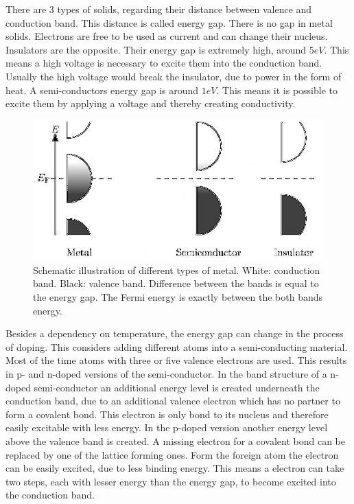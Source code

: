 \documentclass[]{article}
\begin{document}
There are 3 types of solids, regarding their distance between valence and conduction band. This distance is called energy gap. There is no gap in metal solids. Electrons are free to be used as current and can change their nucleus. Insulators are the opposite. Their energy gap is extremely high, around $5eV$. This means a high voltage is necessary to excite them into the conduction band. Usually the high voltage would break the insulator, due to power in the form of heat. A semi-conductors energy gap is around $1eV$. This means it is possible to excite them by applying a voltage and thereby creating conductivity.

\begin{figure}[H]
\centering
\includegraphics[width=.7\textwidth]{Plots/bandstructure.png}
\caption{Schematic illustration of different types of metal. White: conduction band. Black: valence band. Difference between the bands is equal to the energy gap. The Fermi energy is exactly between the both bands energy. \cite{wiki}}
\label{fig:bandstructure}
\end{figure}

Besides a dependency on temperature, the energy gap can change in the process of doping. This considers adding different atoms into a semi-conducting material. Most of the time atoms with three or five valence electrons are used. This results in p- and n-doped versions of the semi-conductor. In the band structure of a n-doped semi-conductor an additional energy level is created underneath the conduction band, due to an additional valence electron which has no partner to form a covalent bond. This electron is only bond to its nucleus and therefore easily excitable with less energy.
In the p-doped version another energy level above the valence band is created. A missing electron for a covalent bond can be replaced by one of the lattice forming ones. Form the foreign atom the electron can be easily excited, due to less binding energy. This means a electron can take two steps, each with lesser energy than the energy gap, to become excited into the conduction band.
\end{document}
